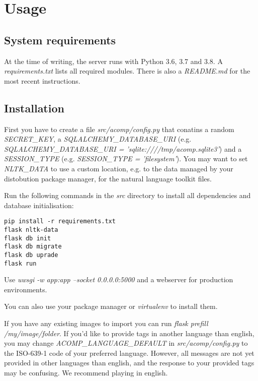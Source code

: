 \section{Usage}
\label{gXLII:sec:usage}  %

\subsection{System requirements}
\label{gXLII:sec:usage:requirements}  %
At the time of writing, the server runs with Python 3.6, 3.7 and 3.8. A
\textit{requirements.txt} lists all required modules.
There is also a \textit{README.md} for the most recent instructions.

\subsection{Installation}
\label{gXLII:sec:usage:instllation}  %
First you have to create a file \textit{src/acomp/config.py} that conatins
a random \textit{SECRET_KEY}, a \textit{SQLALCHEMY_DATABASE_URI}
(e.g. \textit{SQLALCHEMY_DATABASE_URI = 'sqlite:////tmp/acomp.sqlite3'}) and
a \textit{SESSION_TYPE} (e.g. \textit{SESSION_TYPE = 'filesystem'}).
You may want to set \textit{NLTK_DATA} to use a custom location, e.g. to the data
managed by your distobution package manager, for the natural language toolkit files.

Run the following commands in the \textit{src} directory to install all dependencies and
database initialisation:

\begin{lstlisting}
pip install -r requirements.txt
flask nltk-data
flask db init
flask db migrate
flask db uprade
flask run
\end{lstlisting}

Use \textit{uwsgi -w app:app --socket 0.0.0.0:5000} and a webserver for production environments.

You can also use your package manager or \textit{virtualenv} to install them.

If you have any existing images to import you can run
\textit{flask prefill /my/image/folder}.
If you'd like to provide tags in another language than english, you may change
\textit{ACOMP_LANGUAGE_DEFAULT} in \textit{src/acomp/config.py} to the
ISO-639-1  code of your preferred language.
However, all messages are not yet provided in other languages than english,
and the response to your provided tags may be confusing.
We recommend playing in english.

